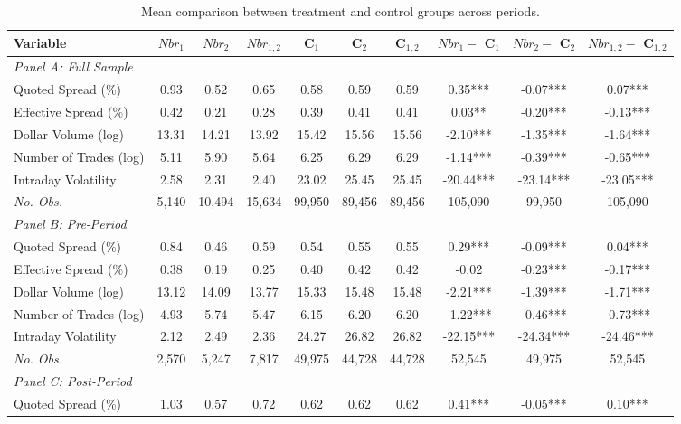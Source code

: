\begin{table}[!htp]
 \centering
 \caption{Mean comparison between treatment and control groups across periods.}
 \label{tab:mean_comparisons}
 \begin{adjustbox}{max width=\textwidth}
 \scriptsize
 \begin{tabular}{lccccccccc}
 \toprule
 Variable & $Nbr_1$ & $Nbr_2$ & $Nbr_{1, 2}$ & C$_1$ & C$_2$ & C$_{1, 2}$ & $Nbr_1 - $ C$_1$ & $Nbr_2 - $ C$_2$ & $Nbr_{1, 2} - $ C$_{1, 2}$ \\
 \midrule
\textit{Panel A: Full Sample} \\
\cmidrule{1-10}
Quoted Spread (\%) & 0.93 & 0.52 & 0.65 & 0.58 & 0.59 & 0.59 & 0.35*** & -0.07*** & 0.07*** \\
Effective Spread (\%) & 0.42 & 0.21 & 0.28 & 0.39 & 0.41 & 0.41 & 0.03** & -0.20*** & -0.13*** \\
Dollar Volume (log) & 13.31 & 14.21 & 13.92 & 15.42 & 15.56 & 15.56 & -2.10*** & -1.35*** & -1.64*** \\
Number of Trades (log) & 5.11 & 5.90 & 5.64 & 6.25 & 6.29 & 6.29 & -1.14*** & -0.39*** & -0.65*** \\
Intraday Volatility & 2.58 & 2.31 & 2.40 & 23.02 & 25.45 & 25.45 & -20.44*** & -23.14*** & -23.05*** \\
\textit{No. Obs.} &  5,140  &  10,494  &  15,634  &  99,950  &  89,456  &  89,456  &  105,090  &  99,950  &  105,090  \\
\cmidrule{1-10}
\textit{Panel B: Pre-Period} \\
\cmidrule{1-10}
Quoted Spread (\%) & 0.84 & 0.46 & 0.59 & 0.54 & 0.55 & 0.55 & 0.29*** & -0.09*** & 0.04*** \\
Effective Spread (\%) & 0.38 & 0.19 & 0.25 & 0.40 & 0.42 & 0.42 & -0.02 & -0.23*** & -0.17*** \\
Dollar Volume (log) & 13.12 & 14.09 & 13.77 & 15.33 & 15.48 & 15.48 & -2.21*** & -1.39*** & -1.71*** \\
Number of Trades (log) & 4.93 & 5.74 & 5.47 & 6.15 & 6.20 & 6.20 & -1.22*** & -0.46*** & -0.73*** \\
Intraday Volatility & 2.12 & 2.49 & 2.36 & 24.27 & 26.82 & 26.82 & -22.15*** & -24.34*** & -24.46*** \\
\textit{No. Obs.} &  2,570  &  5,247  &  7,817  &  49,975  &  44,728  &  44,728  &  52,545  &  49,975  &  52,545  \\
\cmidrule{1-10}
\textit{Panel C: Post-Period} \\
\cmidrule{1-10}
Quoted Spread (\%) & 1.03 & 0.57 & 0.72 & 0.62 & 0.62 & 0.62 & 0.41*** & -0.05*** & 0.10*** \\

\end{tabular}
\end{adjustbox}
\end{table}
